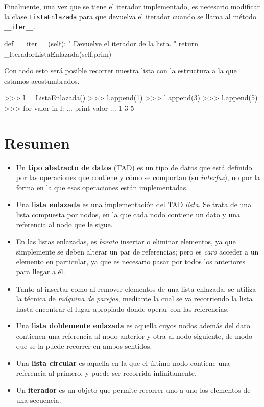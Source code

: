 Finalmente, una vez que se tiene el iterador implementado, es necesario
modificar la clase \lstinline!ListaEnlazada! para que devuelva el iterador
cuando se llama al método \lstinline!__iter__!.

\begin{codigo-python-sn}
    def __iter__(self):
        " Devuelve el iterador de la lista. "
        return _IteradorListaEnlazada(self.prim)
\end{codigo-python-sn}

Con todo esto será posible recorrer nuestra lista con la estructura a la
que estamos acostumbrados.

\begin{codigo-python-sn}
>>> l = ListaEnlazada()
>>> l.append(1)
>>> l.append(3)
>>> l.append(5)
>>> for valor in l:
...     print valor
... 
1
3
5
\end{codigo-python-sn}

\section{Resumen}

\begin{itemize}

\item Un {\bf tipo abstracto de datos} (TAD) es un tipo de datos que está
definido por las operaciones que contiene y cómo se comportan (su {\it
interfaz}), no por la forma en la que esas operaciones están implementadas.

\item Una {\bf lista enlazada} es una implementación del TAD {\it lista}.
Se trata de una lista compuesta por nodos, en la que
cada nodo contiene un dato y una referencia al nodo que le sigue.

\item En las listas enlazadas, es {\it barato} insertar o eliminar
elementos, ya que simplemente se deben alterar un par de referencias; pero
es {\it caro} acceder a un elemento en particular, ya que es necesario
pasar por todos los anteriores para llegar a él.

\item Tanto al insertar como al remover elementos de una lista enlazada, se
utiliza la técnica de {\it máquina de parejas}, mediante la cual se va
recorriendo la lista hasta encontrar el lugar apropiado donde operar con
las referencias.

\item Una {\bf lista doblemente enlazada} es aquella cuyos nodos además del
dato contienen una referencia al nodo anterior y otra al nodo siguiente, de
modo que se la puede recorrer en ambos sentidos.

\item Una {\bf lista circular} es aquella en la que el último nodo contiene
una referencia al primero, y puede ser recorrida infinitamente.

\item Un {\bf iterador} es un objeto que permite recorrer uno a uno los
elementos de una secuencia.

\end{itemize}



